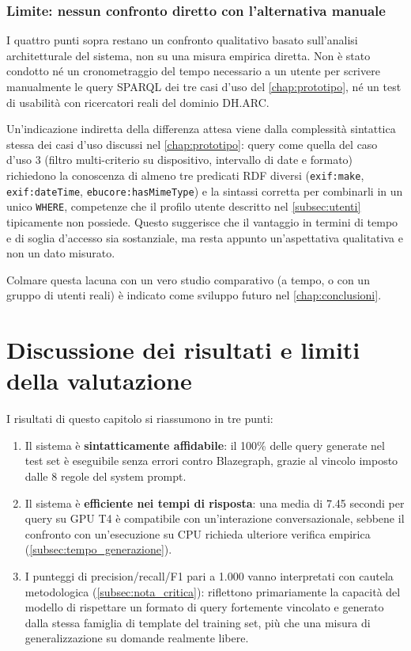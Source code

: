 \documentclass[12pt,a4paper,oneside]{book}
\newcommand{\code}[1]{\colorbox{light-gray}{\texttt{#1}}}
\begin{document}
\subsubsection{Limite: nessun confronto diretto con l'alternativa manuale}

I quattro punti sopra restano un confronto qualitativo basato sull'analisi architetturale del sistema, non su una misura empirica diretta. Non è stato condotto né un cronometraggio del tempo necessario a un utente per scrivere manualmente le query SPARQL dei tre casi d'uso del \cref{chap:prototipo}, né un test di usabilità con ricercatori reali del dominio DH.ARC.\@

Un'indicazione indiretta della differenza attesa viene dalla complessità sintattica stessa dei casi d'uso discussi nel \cref{chap:prototipo}: query come quella del caso d'uso 3 (filtro multi-criterio su dispositivo, intervallo di date e formato) richiedono la conoscenza di almeno tre predicati RDF diversi (\code{exif:make}, \code{exif:dateTime}, \code{ebucore:hasMimeType}) e la sintassi corretta per combinarli in un unico \code{WHERE}, competenze che il profilo utente descritto nel \cref{subsec:utenti} tipicamente non possiede. Questo suggerisce che il vantaggio in termini di tempo e di soglia d'accesso sia sostanziale, ma resta appunto un'aspettativa qualitativa e non un dato misurato.

Colmare questa lacuna con un vero studio comparativo (a tempo, o con un gruppo di utenti reali) è indicato come sviluppo futuro nel \cref{chap:conclusioni}.

\section{Discussione dei risultati e limiti della valutazione}\label{sec:discussione}


I risultati di questo capitolo si riassumono in tre punti:

\begin{enumerate}
    \item Il sistema è \textbf{sintatticamente affidabile}: il 100\% delle query generate nel test set è eseguibile senza errori contro Blazegraph, grazie al vincolo imposto dalle 8 regole del system prompt.
    \item Il sistema è \textbf{efficiente nei tempi di risposta}: una media di 7.45 secondi per query su GPU T4 è compatibile con un'interazione conversazionale, sebbene il confronto con un'esecuzione su CPU richieda ulteriore verifica empirica (\cref{subsec:tempo_generazione}).
    \item I punteggi di precision/recall/F1 pari a 1.000 vanno interpretati con cautela metodologica (\cref{subsec:nota_critica}): riflettono primariamente la capacità del modello di rispettare un formato di query fortemente vincolato e generato dalla stessa famiglia di template del training set, più che una misura di generalizzazione su domande realmente libere.
\end{enumerate}
\end{document}
